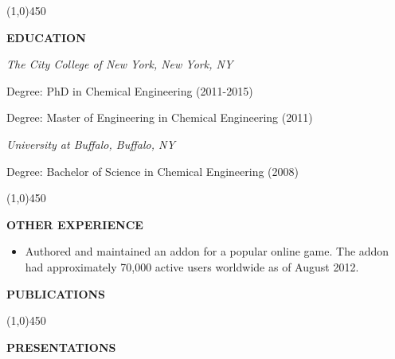 \documentclass[9pt,letterpaper]{article}
\begin{document}
\begin{center}
  \line(1,0){450}
\end{center}

{\singlespacing
\noindent \textbf{EDUCATION}
\newline
}
{\small
\indent \emph{The City College of New York, New York, NY}

\indent \indent Degree: PhD in Chemical Engineering (2011-2015)

\indent \indent Degree: Master of Engineering in Chemical Engineering (2011)

\indent \emph{University at Buffalo, Buffalo, NY}

\indent \indent Degree: Bachelor of Science in Chemical Engineering (2008)
}

\begin{center}
  \line(1,0){450}
\end{center}

{\singlespacing
\noindent \textbf{OTHER EXPERIENCE}

{\small\begin{itemize}
\item Authored and maintained an addon for a popular online game. The addon had approximately 70,000 active users worldwide as of August 2012.
\end{itemize}}}

\newpage

\singlespacing

\noindent \textbf{PUBLICATIONS}
\begin{bibunit}[unsrt]
  \small
  \nocite{*}
  \putbib[citations]
\end{bibunit}

\begin{center}
  \line(1,0){450}
\end{center}

\noindent \textbf{PRESENTATIONS}
\begin{bibunit}[unsrt]
  \small
  \nocite{*}
  \putbib[citations2]
\end{bibunit}
\end{document}
